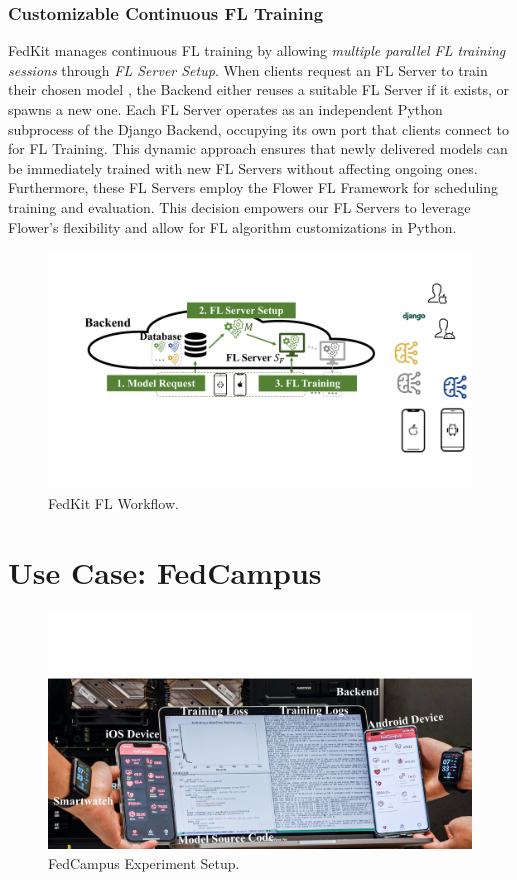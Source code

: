 \documentclass[conference]{IEEEtran}
\begin{document}
\subsubsection{Customizable Continuous FL Training}
FedKit manages continuous FL training by allowing \textit{multiple parallel FL training sessions}
through \textit{FL Server Setup}.
When clients request an FL Server to
train their chosen model \model{},
the Backend either reuses a suitable FL Server \fs{} if it exists,
or spawns a new one.
Each FL Server
operates as an independent Python subprocess of the Django Backend,
occupying its own port that
clients connect to for FL Training.
This dynamic approach ensures that
newly delivered models can be immediately trained with new FL Servers
without affecting ongoing ones.
Furthermore,
these FL Servers employ the Flower FL Framework for
scheduling training and evaluation.
This decision empowers our FL Servers to leverage Flower's flexibility and
allow for FL algorithm customizations in Python.

\begin{figure}
    \centering
    \includegraphics*[width=0.9\linewidth]{fl_workflow.pdf}
    \caption{FedKit FL Workflow.}
    \label{fig:fl-workflow}
\end{figure}

\section{Use Case: FedCampus}

\begin{figure}
    \centering
    \includegraphics*[width=0.9\linewidth]{fedcampus.pdf}
    \caption{FedCampus Experiment Setup.}
    \label{fig:fedcampus}
\end{figure}
\end{document}
